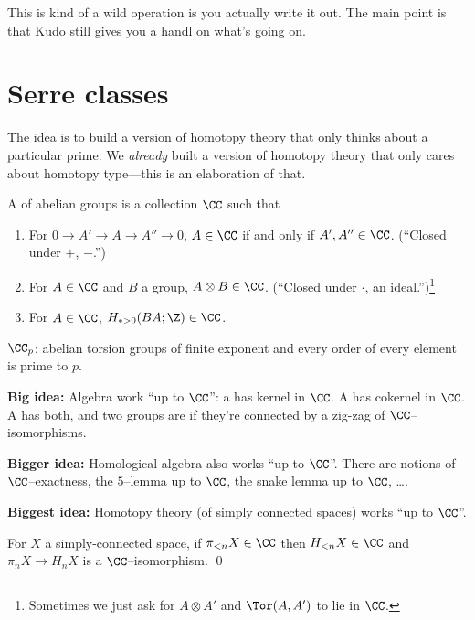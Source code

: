 This is kind of a wild operation is you actually write it out.  The main point is that Kudo still gives you a handl on what's going on.





\section{Serre classes}

The idea is to build a version of homotopy theory that only thinks about a particular prime.  We \emph{already} built a version of homotopy theory that only cares about homotopy type---this is an elaboration of that.

\begin{definition}
A  of abelian groups is a collection $\CC$ such that
\begin{enumerate}
    \item For $0 \to A' \to A \to A'' \to 0$, $A \in \CC$ if and only if $A', A'' \in \CC$.  (``Closed under $+$, $-$.'')
    \item For $A \in \CC$ and $B$ a group, $A \otimes B \in \CC$.  (``Closed under $\cdot$, an ideal.'')\footnote{Sometimes we just ask for $A \otimes A'$ and $\Tor(A, A')$ to lie in $\CC$.}
    \item For $A \in \CC$, $H_{* > 0}(BA; \Z) \in \CC$.
\end{enumerate}
\end{definition}

\begin{example}
$\CC_p$: abelian torsion groups of finite exponent and every order of every element is prime to $p$.
\end{example}

\textbf{Big idea:} Algebra work ``up to $\CC$'': a  has kernel in $\CC$.  A  has cokernel in $\CC$.  A  has both, and two groups are  if they're connected by a zig-zag of $\CC$--isomorphisms.

\textbf{Bigger idea:} Homological algebra also works ``up to $\CC$''.  There are notions of $\CC$--exactness, the $5$--lemma up to $\CC$, the snake lemma up to $\CC$, \ldots .

\textbf{Biggest idea:} Homotopy theory (of simply connected spaces) works ``up to $\CC$''.

\begin{theorem}[Hurewicz]
For $X$ a simply-connected space, if $\pi_{< n} X \in \CC$ then $H_{< n} X \in \CC$ and $\pi_n X \to H_n X$ is a $\CC$--isomorphism. \qed
\end{theorem}

